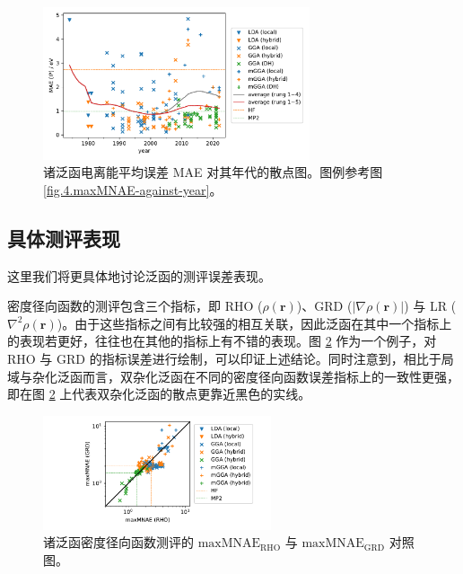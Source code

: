 \begin{figure}[t]
    \centering
    \includegraphics[width=0.7\textwidth]{assets/MAE-etot-against-year.pdf}
    \caption[电离能平均误差 MAE 对年代的散点图]{诸泛函电离能平均误差 MAE 对其年代的散点图。图例参考图 \ref{fig.4.maxMNAE-against-year}。}
    \label{fig.4.MAE-etot-against-year}
\end{figure}

\subsection{具体测评表现}

这里我们将更具体地讨论泛函的测评误差表现。

密度径向函数的测评包含三个指标，即 RHO ($\rho(\bm{r})$)、GRD ($|\nabla \rho(\bm{r})|$) 与 LR ($\nabla^2 \rho(\bm{r})$)。由于这些指标之间有比较强的相互关联，因此泛函在其中一个指标上的表现若更好，往往也在其他的指标上有不错的表现。图 \ref{fig.4.compare-err-RHO-GRD} 作为一个例子，对 RHO 与 GRD 的指标误差进行绘制，可以印证上述结论。同时注意到，相比于局域与杂化泛函而言，双杂化泛函在不同的密度径向函数误差指标上的一致性更强，即在图 \ref{fig.4.compare-err-RHO-GRD} 上代表双杂化泛函的散点更靠近黑色的实线。

\begin{figure}[t]
    \centering
    \includegraphics[width=0.6\textwidth]{assets/compare-err-RHO-GRD.pdf}
    \caption[密度径向函数 $\text{maxMNAE}_\text{RHO}$ 与 $\text{maxMNAE}_\text{GRD}$ 对照图]{诸泛函密度径向函数测评的 $\text{maxMNAE}_\text{RHO}$ 与 $\text{maxMNAE}_\text{GRD}$ 对照图。}
    \label{fig.4.compare-err-RHO-GRD}
\end{figure}

